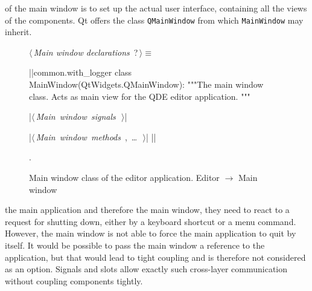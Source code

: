 \documentclass[%
    a4paper,    %
    justified,  %
    nobib,      %
    openany     %
]{tufte-book}
\begin{document}
 of the main window is to set up the actual
user interface, containing all the views of the components. Qt offers the class
\verb+QMainWindow+ from which \verb=MainWindow= may inherit.

\begin{figure}
\begin{flushleft} \small
\begin{minipage}{\linewidth}\label{scrap15}\raggedright\small
{} $\langle\,${\itshape Main window declarations}\nobreak\ {\footnotesize {?}}$\,\rangle\equiv$
\vspace{-1ex}
\begin{pythoncode}
|\normalfont{}\fontfamily{}|common.with_logger
class MainWindow(QtWidgets.QMainWindow):
    """The main window class.
    Acts as main view for the QDE editor application.
    """

    |\hbox{$\langle\,${\itshape Main window signals}\nobreak\ {\footnotesize {}}$\,\rangle$}|

    |\hbox{$\langle\,${\itshape Main window methods}\nobreak\ {\footnotesize {}, \ldots\ }$\,\rangle$}|
|\NWsep|
\end{pythoncode}
\vspace{1.5ex}
\footnotesize
\begin{list}{}{\setlength{\itemsep}{-\parsep}\setlength{\itemindent}{-\leftmargin}}
\item {\NWtxtMacroNoRef}.

\item{}
\end{list}
\end{minipage}\vspace{4ex}
\end{flushleft}
\caption{Main window class of the editor application.
  \newline{}\newline{}Editor $\rightarrow$ Main window}
  \label{editor:lst:main-window}
\end{figure}

 the main application and therefore the
main window, they need to react to a request for shutting down, either by a
keyboard shortcut or a menu command. However, the main window is not able to
force the main application to quit by itself. It would be possible to pass the
main window a reference to the application, but that would lead to tight
coupling and is therefore not considered as an option. Signals and slots allow
exactly such cross-layer communication without coupling components tightly.
\end{document}
